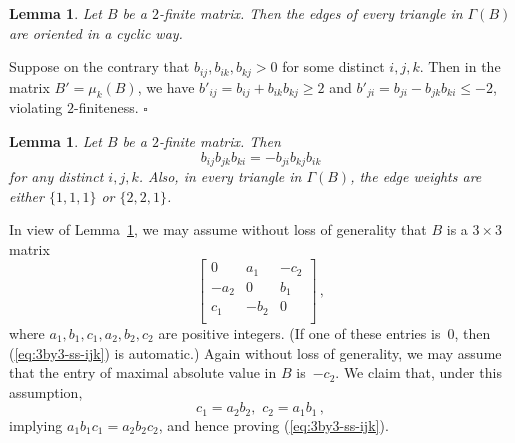\documentclass[letterpaper]{amsart}
\numberwithin{equation}{section}
\newtheorem{lemma}[theorem]{Lemma}
\theoremstyle{definition}
\def\proof{\smallskip\noindent {\bf Proof.\ }}
\def\endproof{\hfill$\square$\medskip}
\begin{document}
 
 
\begin{lemma} 
\label{lem:2-finite-3-cycle} 
Let $B$ be a $2$-finite matrix. 
Then the edges of every triangle in $\Gamma(B)$ are 
oriented in a cyclic way. 
\end{lemma} 
 
\proof 
Suppose on the contrary that 
$b_{ij}, b_{ik}, b_{kj} > 0$ for some distinct $i,j,k$. 
Then in the matrix $B' = \mu_k (B)$, we have 
$b'_{ij} = b_{ij} + b_{ik} b_{kj} \geq 2$ and 
$b'_{ji} = b_{ji} - b_{jk} b_{ki} \leq -2$, 
violating $2$-finiteness. 
\endproof 
 
\begin{lemma} 
\label{lem:2-finite-3-ss} 
Let $B$ be a $2$-finite matrix. Then 
\begin{equation} 
\label{eq:3by3-ss-ijk} 
b_{ij} b_{jk} b_{ki} = -b_{ji} b_{kj} b_{ik} 
\end{equation} 
for any distinct $i,j,k$. 
Also, in every triangle in $\Gamma(B)$, the edge weights are either 
$\{1,1,1\}$ or $\{2,2,1\}$. 
\end{lemma} 
 
\proof 
In view of Lemma~\ref{lem:2-finite-3-cycle}, 
we may assume without loss of generality that 
$B$ is a $3 \times 3$ matrix 
\begin{equation} 
\label{eq:3by3matrix} 
\left[\begin{array}{ccc} 
0   & a_1 & - c_2 \\ 
-a_2 & 0   & b_1 \\ 
c_1 & -b_2 & 0 \\ 
\end{array}\right] \,, 
\end{equation} 
where $a_1,b_1,c_1,a_2,b_2,c_2$ are positive integers. 
(If one of these entries is~$0$, then (\ref{eq:3by3-ss-ijk}) is 
automatic.) 
Again without loss of generality, we may assume that 
the entry of maximal absolute value in $B$ is~$-c_2$. 
We claim that, under this assumption, 
\begin{equation} 
\label{eq:strong-3-cyclic} 
c_1 = a_2 b_2, \,\, c_2 = a_1 b_1 \, , 
\end{equation} 
implying $a_1 b_1 c_1 = a_2 b_2 c_2$, 
and hence proving (\ref{eq:3by3-ss-ijk}). 
 
\end{document}
